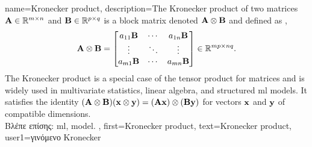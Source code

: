 {name={Kronecker product}, 
	description={The Kronecker product  of two matrices ${\bf A} \in \mathbb{R}^{m \times n}$ 
		and ${\bf B} \in \mathbb{R}^{p \times q}$ is a block matrix denoted ${\bf A} \otimes {\bf B}$ 
	 	and defined as \cite{GolubVanLoanBook}, \cite{HornMatAnalysis}
    		\[
      		{\bf A} \otimes {\bf B} =
      		\begin{bmatrix}
        		a_{11}{\bf B} & \cdots & a_{1n}{\bf B} \\
        		\vdots & \ddots & \vdots \\
        		a_{m1}{\bf B} & \cdots & a_{mn}{\bf B}
      		\end{bmatrix}
      		\in \mathbb{R}^{mp \times nq}.
    		\]
    		The Kronecker product is a special case of the tensor product for matrices and is 
		widely used in multivariate statistics, linear algebra, and structured \gls{ml} \gls{model}s. 
		It satisfies the identity $({\bf A} \otimes {\bf B})({\bf x} \otimes {\bf y}) = ({\bf A}{\bf x}) \otimes ({\bf B}{\bf y})$ 
		for vectors ${\bf x}$ and ${\bf y}$ of compatible dimensions. \\
		\foreignlanguage{greek}{Βλέπε επίσης:} \gls{ml}, \gls{model}. },
	first={Kronecker product},
	text={Kronecker product},
	user1={\foreignlanguage{greek}{γινόμενο} Kronecker} %
}

